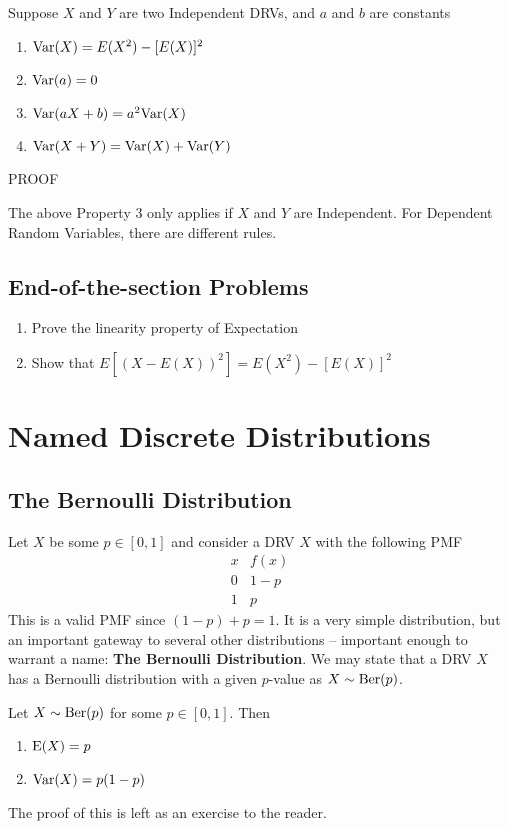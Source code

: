 \documentclass{report}
\begin{document}
\begin{theorem}
    Suppose $X$ and $Y$ are two Independent DRVs, and $a$ and $b$ are constants
    \begin{enumerate}
        \item $\textup{Var}(X)=E(X^2)-[E(X)]^2$
        \item $\textup{Var}(a)=0$
        \item $\textup{Var}(aX+b)=a^2\textup{Var}(X)$
        \item $\textup{Var}(X+Y)=\textup{Var}(X)+\textup{Var}(Y)$
    \end{enumerate}
    \todo PROOF
\end{theorem}

\begin{notsofast}
    The above Property 3 only applies if $X$ and $Y$ are Independent. For Dependent Random Variables, there are different rules.
\end{notsofast}


\subsection*{End-of-the-section Problems}
\begin{enumerate}
    \item Prove the linearity property of Expectation
    \item Show that $E[(X-E(X))^2]=E(X^2)-[E(X)]^2$
\end{enumerate}

\section{Named Discrete Distributions}
\subsection{The Bernoulli Distribution}
\newcommand{\ber}{\textup{Ber}}
Let $X$ be some $p\in[0,1]$ and consider a DRV $X$ with the following PMF
\[
    \begin{array}{c|c}
         x & f(x) \\
         \hline
         0 & 1-p \\
         1 & p
    \end{array}
\]
This is a valid PMF since $(1-p)+p=1$. It is a very simple distribution, but an important gateway to several other distributions -- important enough to warrant a name: \textbf{The Bernoulli Distribution}. We may state that a DRV $X$ has a Bernoulli distribution with a given $p$-value as $X\sim\ber(p)$.
\begin{theorem}
    Let $X\sim\ber(p)$ for some $p\in[0,1]$. Then
    \begin{enumerate}
        \item $\textup{E}(X)=p$
        \item $\textup{Var}(X)=p(1-p)$
    \end{enumerate}

    The proof of this is left as an exercise to the reader.
\end{theorem}
\label{thm:propsbin}
\end{document}
